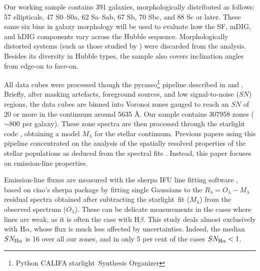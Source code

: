 \documentclass[a4paper, fleqn, usenatbib, useAMS]{mnras}
\newcommand{\Ha}{\ifmmode {\rm H}\alpha \else H$\alpha$\fi\xspace}
\newcommand{\Hb}{\ifmmode {\rm H}\beta \else H$\beta$\fi\xspace}
\newcommand\pycasso{{\sc p}y{\sc casso}}          	%
\newcommand\starlight{{\sc starlight}}          		%
\begin{document}
Our working sample contains 391 galaxies, morphologically distributed as follows: 57 ellipticals, 47 S0--S0a, 62 Sa--Sab, 67 Sb, 70 Sbc, and 88 Sc or later. These same six bins in galaxy morphology will be used to evaluate how the SF, mDIG, and hDIG components vary across the Hubble sequence. Morphologically distorted systems (such as those studied by \citealt{Wild.etal.2014, BB.etal.2015b, BB.etal.2015a, CortijoFerrero.etal.2017b, CortijoFerrero.etal.2017a}) were discarded from the analysis. Besides its diversity in Hubble types, the sample also covers inclination angles from edge-on to face-on.

All data cubes were processed though the \pycasso\footnote{Python CALIFA \starlight\ Synthesis Organizer} pipeline described in \citet{CidFernandes.etal.2013a} and \citet{Andre.etal.2017}. Briefly, after masking artefacts, foreground sources, and low signal-to-noise ($SN$) regions, the data cubes are binned into Voronoi zones gauged to reach an $SN$ of 20 or more in the continuum around 5635 \AA. Our sample contains 307958 zones ($\sim 800$ per galaxy). These zone spectra are then processed through the {\sc starlight} code \citep{CidFernandes.etal.2005a}, obtaining a model $M_\lambda$ for the stellar continuum. Previous papers using this pipeline concentrated on the analysis of the spatially resolved properties of the stellar populations as deduced from the spectral fits \citep{Perez.etal.2013, GonzalezDelgado.etal.2014b, GonzalezDelgado.etal.2015a, GonzalezDelgado.etal.2016a, GonzalezDelgado.etal.2017}.  Instead, this paper focuses on emission-line properties.

Emission-line fluxes are measured with the {\sc sherpa} IFU line fitting software \citep[SHIFU;][]{RGB.etal.2017}, based on {\sc ciao's sherpa} package \citep{Freeman.etal.2001, Doe.etal.2007} by fitting single Gaussians to the $R_\lambda = O_\lambda - M_\lambda$ residual spectra obtained after subtracting the \starlight\ fit ($M_\lambda$) from the observed spectrum ($O_\lambda$). These can be delicate measurements in the cases where lines are weak, as it is often the case with \Hb. This study deals almost exclusively with \Ha, whose flux is much less affected by uncertainties. Indeed, the median $SN_{\Ha}$ is 16 over all our zones, and in only 5 per cent of the cases $SN_{\Ha} < 1$.
\end{document}
